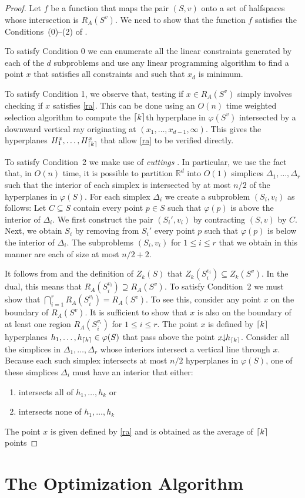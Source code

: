 \documentclass[lotsofwhite]{patmorin}
\newcommand{\drop}{\!\!\downarrow\!\!}
\newcommand{\dual}{\varphi}
\begin{document}
\begin{proof}
Let $f$ be a function that maps the pair $(S,v)$ onto a set of
halfspaces whose intersection is $R_A(S^v)$.  We need to show that the
function $f$ satisfies the Conditions~(0)--(2) of .

To satisfy Condition 0 we can enumerate all the linear constraints
generated by each of the $d$ subproblems and use any linear
programming algorithm to find a point $x$ that satisfies all
constraints and such that $x_d$ is minimum.

To satisfy Condition 1, we observe that, testing if $x\in R_A(S^v)$
simply involves checking if $x$ satisfies \eqref{ra}.  This can be done
using an $O(n)$ time weighted selection algorithm to compute the
$\left\lceil k \right\rceil$th hyperplane in $\dual(S^v)$ intersected by a downward
vertical ray originating at $(x_1,\ldots,x_{d-1},\infty)$.  This gives
the hyperplanes $H_1^x,\ldots,H_{\left\lceil k \right\rceil}^x$ that allow \eqref{ra} to
be verified directly.

To satisfy Condition~2 we make use of \emph{cuttings} \cite{X}.  In
particular, we use the fact that, in $O(n)$ time, it is possible to
partition $\mathbb{R}^d$ into $O(1)$ simplices
$\Delta_1,\ldots,\Delta_r$ such that the interior of each simplex is
intersected by at most $n/2$ of the hyperplanes in $\dual(S)$.  For
each simplex $\Delta_i$ we create a subproblem $(S_i,v_i)$ as follows:
Let $C\subseteq S$ contain every point $p\in S$ such that $\dual(p)$
is above the interior of $\Delta_i$.  We first construct the pair
$(S_i',v_i)$ by contracting $(S,v)$ by $C$.  Next, we obtain $S_i$ by
removing from $S_i'$ every point $p$ such that $\dual(p)$ is below the
interior of $\Delta_i$.  The subproblems $(S_i,v_i)$ for $1\le i\le r$
that we obtain in this manner are each of size at most $n/2+2$.

It follows from  and the definition of $Z_k(S)$
that $Z_k(S_i^{v_i})\subseteq Z_k(S^v)$.  In the dual, this means that
$R_A(S_i^{v_i})\supseteq R_A(S^v)$.  To satisfy Condition~2 we must
show that $\bigcap_{i=1}^r R_A(S_i^{v_i}) = R_A(S^v)$.  To see this,
consider any point $x$ on the boundary of $R_A(S^v)$.  It is
sufficient to show that $x$ is also on the boundary of at least one
region $R_A(S_i^{v_i})$ for $1\le i\le r$.  The point $x$ is defined
by $\left\lceil k \right\rceil$ hyperplanes $h_1,\ldots,h_{\ceil{k}}\in\dual(S)$ that pass
above the point $x\drop h_{\ceil{k}}$.  Consider all the simplices in
$\Delta_1,\ldots,\Delta_r$ whose interiors intersect a vertical line
through $x$.  Because each such simplex intersects at most $n/2$
hyperplanes in $\dual(S)$, one of these simplices $\Delta_i$ must
have an interior that either: 
\begin{enumerate} 
\item intersects all of $h_1,\ldots,h_k$ or
\item intersects none of $h_1,\ldots,h_k$
\end{enumerate}


The point $x$ is given
defined by \eqref{ra} and is obtained as the average of $\left\lceil k \right\rceil$ points




\end{proof}


\section{The Optimization Algorithm}
\end{document}

